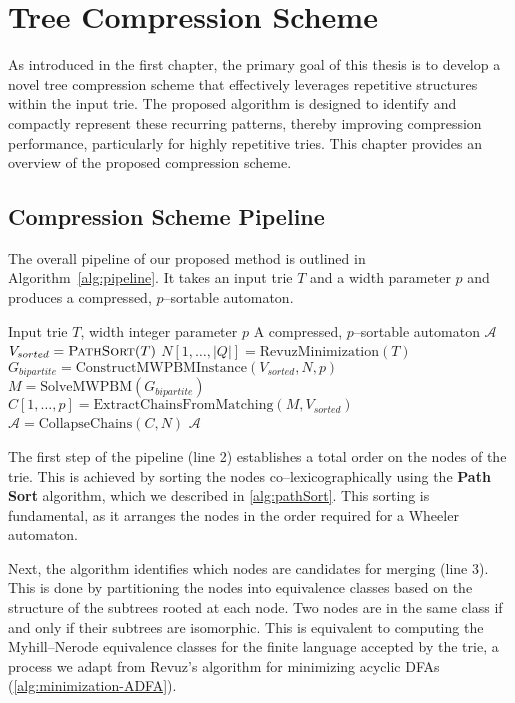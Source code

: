 \chapter{Tree Compression Scheme} \label{chp:project_overview}
As introduced in the first chapter, the primary goal of this thesis is to develop a novel tree compression scheme that effectively leverages repetitive structures within the input trie. The proposed algorithm is designed to identify and compactly represent these recurring patterns, thereby improving compression performance, particularly for highly repetitive tries. This chapter provides an overview of the proposed compression scheme.

\section{Compression Scheme Pipeline}
The overall pipeline of our proposed method is outlined in Algorithm~\ref{alg:pipeline}. It takes an input trie $T$ and a width parameter $p$ and produces a compressed, $p$--sortable automaton.
\begin{algorithm}[H]
\caption{$\textsc{CompressTrie}(T,p)$}
\label{alg:pipeline}
\begin{algorithmic}[1]
\Require Input trie $T$, width integer parameter $p$
\Ensure A compressed, $p$--sortable automaton $\mathcal{A}$
    \State $V_{sorted} = \textsc{PathSort}(T)$ 
    \State $N[1,\dots,|Q|] = \text{RevuzMinimization}(T)$
    \State $G_{bipartite} = \text{ConstructMWPBMInstance}(V_{sorted}, N, p)$
    \State $M = \text{SolveMWPBM}(G_{bipartite})$ 
    \State $C[1,\dots,p] = \text{ExtractChainsFromMatching}(M, V_{sorted})$ 
    \State $\mathcal{A} = \text{CollapseChains}(C, N)$ 
    \State \Return $\mathcal{A}$
\end{algorithmic}
\end{algorithm}

The first step of the pipeline (line 2) establishes a total order on the nodes of the trie. This is achieved by sorting the nodes co--lexicographically using the \textbf{Path Sort} algorithm, which we described in \cref{alg:pathSort}. This sorting is fundamental, as it arranges the nodes in the order required for a Wheeler automaton.

Next, the algorithm identifies which nodes are candidates for merging (line 3). This is done by partitioning the nodes into equivalence classes based on the structure of the subtrees rooted at each node. Two nodes are in the same class if and only if their subtrees are isomorphic. This is equivalent to computing the Myhill--Nerode equivalence classes for the finite language accepted by the trie, a process we adapt from Revuz's algorithm for minimizing acyclic DFAs (\cref{alg:minimization-ADFA}).

